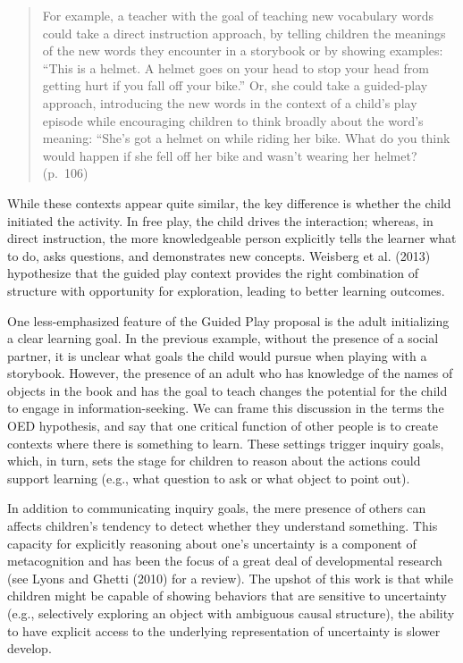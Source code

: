 \documentclass[english,floatsintext,man]{apa6}
\theoremstyle{definition}
\theoremstyle{definition}
\theoremstyle{definition}
\theoremstyle{remark}
\begin{document}
\begin{quote}
For example, a teacher with the goal of teaching new vocabulary words
could take a direct instruction approach, by telling children the
meanings of the new words they encounter in a storybook or by showing
examples: \enquote{This is a helmet. A helmet goes on your head to stop
your head from getting hurt if you fall off your bike.} Or, she could
take a guided-play approach, introducing the new words in the context of
a child's play episode while encouraging children to think broadly about
the word's meaning: ``She's got a helmet on while riding her bike. What
do you think would happen if she fell off her bike and wasn't wearing
her helmet? (p.~106)
\end{quote}

\noindent
While these contexts appear quite similar, the key difference is whether
the child initiated the activity. In free play, the child drives the
interaction; whereas, in direct instruction, the more knowledgeable
person explicitly tells the learner what to do, asks questions, and
demonstrates new concepts. Weisberg et al. (2013) hypothesize that the
guided play context provides the right combination of structure with
opportunity for exploration, leading to better learning outcomes.

One less-emphasized feature of the Guided Play proposal is the adult
initializing a clear learning goal. In the previous example, without the
presence of a social partner, it is unclear what goals the child would
pursue when playing with a storybook. However, the presence of an adult
who has knowledge of the names of objects in the book and has the goal
to teach changes the potential for the child to engage in
information-seeking. We can frame this discussion in the terms the OED
hypothesis, and say that one critical function of other people is to
create contexts where there is something to learn. These settings
trigger inquiry goals, which, in turn, sets the stage for children to
reason about the actions could support learning (e.g., what question to
ask or what object to point out).

In addition to communicating inquiry goals, the mere presence of others
can affects children's tendency to detect whether they understand
something. This capacity for explicitly reasoning about one's
uncertainty is a component of metacognition and has been the focus of a
great deal of developmental research (see Lyons and Ghetti (2010) for a
review). The upshot of this work is that while children might be capable
of showing behaviors that are sensitive to uncertainty (e.g.,
selectively exploring an object with ambiguous causal structure), the
ability to have explicit access to the underlying representation of
uncertainty is slower develop.
\end{document}
